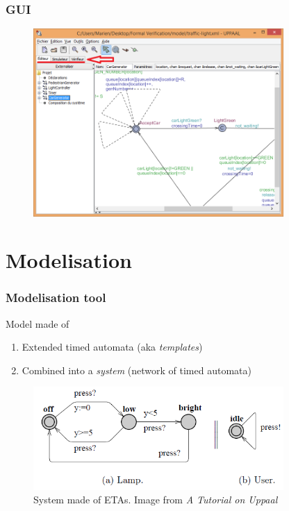\documentclass{beamer}
\begin{document}
\begin{frame}
	\frametitle{GUI}
	\begin{figure}
    	\centering
    	\includegraphics[width = 0.85\textwidth]{uppaal_main_window.png}
  	\end{figure}
\end{frame}

\section{Modelisation}
\begin{frame}
	\frametitle{Modelisation tool}
	\begin{block}{Model made of}
		\begin{enumerate}
			\item Extended timed automata (aka \textit{templates})
			\item Combined into a \textit{system} (network of timed automata)
		\end{enumerate}
	\end{block}
	\begin{figure}
    	\centering
    	\includegraphics[width = 0.85\textwidth]{timed_automata_uppaal.png}
    	\caption{System made of ETAs. Image from \textit{A Tutorial on Uppaal}}
  	\end{figure}
	
\end{frame}
\end{document}
